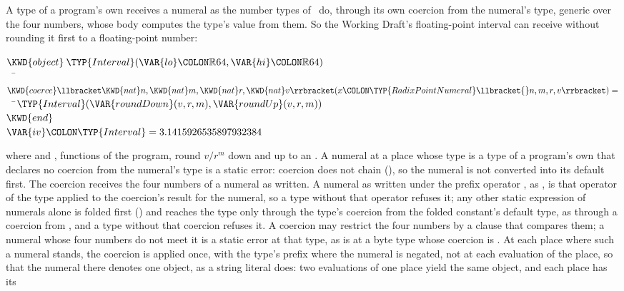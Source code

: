 A type of a program's own receives a numeral as the number types of \library\
do, through its own coercion from the numeral's type, generic over the four
numbers, whose body computes the type's value from them.
So the Working Draft's floating-point interval can receive
 without rounding it first to a floating-point
number:
\begin{Fortress}
\(\KWD{object}\:\TYP{Interval}(\VAR{lo}\COLON\mathbb{R}64, \VAR{hi}\COLON\mathbb{R}64)\)\\
{\tt~~}\pushtabs\=\+\(  \KWD{coerce}\llbracket\KWD{nat} n,\KWD{nat} m,\KWD{nat} r,\KWD{nat} v\rrbracket(x\COLON \TYP{RadixPointNumeral}\llbracket{}n,m,r,v\rrbracket) =\)\\
{\tt~~}\pushtabs\=\+\(    \TYP{Interval}(\VAR{roundDown}(v, r, m), \VAR{roundUp}(v, r, m))\)\-\-\\\poptabs\poptabs
\(\KWD{end}\)\\[4pt]
\(\VAR{iv}\COLON\TYP{Interval} = 3.1415926535897932384\)
\end{Fortress}
where  and , functions of the program, round
$v/r^m$ down and up to an \EXP{\mathbb{R}64}.
A numeral at a place whose type is a type of a program's own that declares no
coercion from the numeral's type is a static error: coercion does not chain
(\secref{coercion}), so the numeral is not converted into its default first.
The coercion receives the four numbers of a numeral as written.
A numeral as written under the prefix operator \EXP{-}, as , is that
operator of the type applied to the coercion's result for the numeral, so a type
without that operator refuses it; any other static expression of numerals alone
is folded first (\secref{static-expr}) and reaches the type only through the
type's coercion from the folded constant's default type, as \EXP{1/2} through a
coercion from \EXP{\mathbb{Q}}, and a type without that coercion refuses it.
A coercion may restrict the four numbers by a \KWD{where} clause that compares
them; a numeral whose four numbers do not meet it is a static error at that
type, as \EXP{300} is at a byte type whose coercion is
.
At each place where such a numeral stands, the coercion is applied once, with
the type's prefix \EXP{-} where the numeral is negated, not at each evaluation
of the place, so that the numeral there denotes one object, as a string literal
does: two evaluations of one place yield the same object, and each place has its
